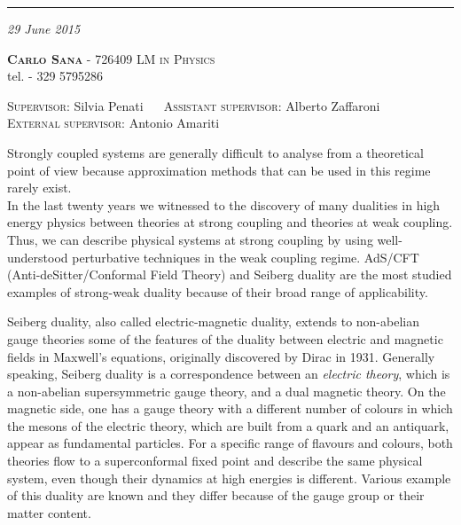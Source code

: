 \documentclass[a4paper,11pt]{article}
\date{}
\title{ \textbf{\boldmath{4D to 3D reduction of Seiberg duality for $SU(N)$ susy gauge theories with adjoint matter: a partition function approach }}	}
\author{}
\begin{document}
\maketitle
\vspace*{-2.3cm}
\begin{center}
\rule{\textwidth}{0.6pt}
\textit {29 June 2015} \\
 \end{center}
\vspace{-0.3cm}
	 \textbf{\noindent%
	 \scshape%
	 Carlo Sana} - \textsf{726409}  \hfill
 {\scshape LM in Physics} 
\\
\noindent  tel. \textsf{- 329 5795286}\\
\vspace{-0.5cm}
\begin{center}
{\scshape Supervisor}: 
\textsf{Silvia Penati} 
~~
{\scshape Assistant supervisor}:
\textsf{Alberto Zaffaroni}
\\
{\scshape External supervisor}:
\textsf{Antonio Amariti}

\end{center}



Strongly coupled systems are generally difficult to analyse from a theoretical point of view because approximation methods that can be used in this regime rarely exist.\\
In the last twenty years we witnessed to the discovery of many dualities in high energy physics between theories at strong coupling and theories at weak coupling.
Thus, we can describe physical systems at strong coupling by using well-understood perturbative techniques in the weak coupling regime. 
AdS/CFT (Anti-deSitter/Conformal Field Theory) and Seiberg duality are the most studied examples of strong-weak duality because of their broad range of applicability.

Seiberg duality, also called electric-magnetic duality, extends to non-abelian gauge theories some of the features of the duality between electric and magnetic fields in Maxwell's equations, originally discovered by Dirac in 1931.
Generally speaking, Seiberg duality is a correspondence between an \emph{electric theory}, which is a non-abelian supersymmetric gauge theory, and a dual magnetic theory. 
On the magnetic side, one has a gauge theory with a different number of colours  in which the mesons of the electric theory, which are built from a quark and an antiquark, appear as fundamental particles.
For a specific range of flavours and colours, both theories flow to a superconformal fixed point and describe the same physical system, even though their dynamics at high energies is different.
Various example of this duality are known and they differ because of the gauge group or their matter content.
\end{document}

